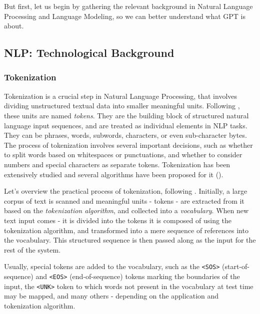 \documentclass{article}
\begin{document}
\medskip
\noindent
But first, let us begin by gathering the relevant background in Natural Language Processing and Language Modeling, so we can better understand what GPT is about.



\subsection{NLP: Technological Background}
\label{sec:nlp-background}

\subsubsection{Tokenization}
\label{subsec:tokenization}

Tokenization is a crucial step in Natural Language Processing, that involves dividing unstructured textual data into smaller meaningful units. Following \citet{webster1992tokenization}, these units are named \emph{tokens}. They are the building block of structured natural language input sequences, and are treated as individual elements in NLP tasks. They can be phrases, words, subwords, characters, or even sub-character bytes. The process of tokenization involves several important decisions, such as whether to split words based on whitespaces or punctuations, and whether to consider numbers and special characters as separate tokens. Tokenization has been extensively studied and several algorithms have been proposed for it (\citet{mielke2021between}). 

\medskip
\noindent
Let's overview the practical process of tokenization, following \citet{pai2020tokenization}. Initially, a large corpus of text is scanned and meaningful units - tokens - are extracted from it based on the \emph{tokenization algorithm}, and collected into a \emph{vocabulary}. When new text input comes - it is divided into the tokens it is composed of using the tokenization algorithm, and transformed into a mere sequence of references into the vocabulary. This structured sequence is then passed along as the input for the rest of the system.

\medskip
\noindent
Usually, special tokens are added to the vocabulary, such as the \texttt{<SOS>} (start-of-sequence) and \texttt{<EOS>} (end-of-sequence) tokens marking the boundaries of the input, the \texttt{<UNK>} token to which words not present in the vocabulary at test time may be mapped, and many others - depending on the application and tokenization algorithm.
\end{document}
